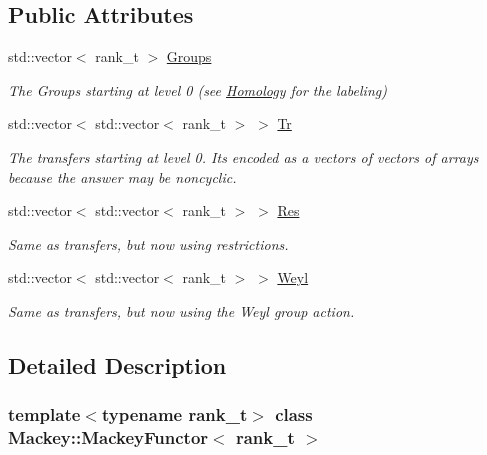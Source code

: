 \subsection*{Public Attributes}
\begin{DoxyCompactItemize}
\item 
std\+::vector$<$ rank\+\_\+t $>$ \hyperlink{classMackey_1_1MackeyFunctor_a4f8f5f7ac6267bdee2a67c8874bdd9a3}{Groups}
\begin{DoxyCompactList}\small\item\em The Groups starting at level 0 (see \hyperlink{classMackey_1_1Homology}{Homology} for the labeling) \end{DoxyCompactList}\item 
std\+::vector$<$ std\+::vector$<$ rank\+\_\+t $>$ $>$ \hyperlink{classMackey_1_1MackeyFunctor_a3106846b46d3eb4d297abe785bdb0481}{Tr}
\begin{DoxyCompactList}\small\item\em The transfers starting at level 0. It\textquotesingle{}s encoded as a vectors of vectors of arrays because the answer may be noncyclic. \end{DoxyCompactList}\item 
std\+::vector$<$ std\+::vector$<$ rank\+\_\+t $>$ $>$ \hyperlink{classMackey_1_1MackeyFunctor_a9299f915835edaa2b67880bfe6330502}{Res}
\begin{DoxyCompactList}\small\item\em Same as transfers, but now using restrictions. \end{DoxyCompactList}\item 
std\+::vector$<$ std\+::vector$<$ rank\+\_\+t $>$ $>$ \hyperlink{classMackey_1_1MackeyFunctor_aa6488386f0731b1a2c80b494376709a0}{Weyl}
\begin{DoxyCompactList}\small\item\em Same as transfers, but now using the Weyl group action. \end{DoxyCompactList}\end{DoxyCompactItemize}


\subsection{Detailed Description}
\subsubsection*{template$<$typename rank\+\_\+t$>$\newline
class Mackey\+::\+Mackey\+Functor$<$ rank\+\_\+t $>$}

